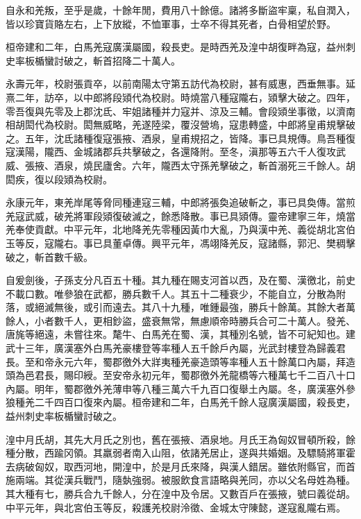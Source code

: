 \begin{pinyinscope}
自永和羌叛，至乎是歲，十餘年閒，費用八十餘億。諸將多斷盜牢稟，私自潤入，皆以珍寶貨賂左右，上下放縱，不恤軍事，士卒不得其死者，白骨相望於野。

桓帝建和二年，白馬羌寇廣漢屬國，殺長吏。是時西羌及湟中胡復畔為寇，益州刺史率板楯蠻討破之，斬首招降二十萬人。

永壽元年，校尉張貢卒，以前南陽太守第五訪代為校尉，甚有威惠，西垂無事。延熹二年，訪卒，以中郎將段熲代為校尉。時燒當八種寇隴右，熲擊大破之。四年，零吾復與先零及上郡沈氐、牢姐諸種并力寇并、涼及三輔。會段熲坐事徵，以濟南相胡閎代為校尉。閎無威略，羌遂陸梁，覆沒營塢，寇患轉盛，中郎將皇甫規擊破之。五年，沈氐諸種復寇張掖、酒泉，皇甫規招之，皆降。事已具規傳。鳥吾種復寇漢陽，隴西、金城諸郡兵共擊破之，各還降附。至冬，滇那等五六千人復攻武威、張掖、酒泉，燒民廬舍。六年，隴西太守孫羌擊破之，斬首溺死三千餘人。胡閎疾，復以段熲為校尉。

永康元年，東羌岸尾等脅同種連寇三輔，中郎將張奐追破斬之，事已具奐傳。當煎羌寇武威，破羌將軍段熲復破滅之，餘悉降散。事已具熲傳。靈帝建寧三年，燒當羌奉使貢獻。中平元年，北地降羌先零種因黃巾大亂，乃與漢中羌、義從胡北宮伯玉等反，寇隴右。事已具董卓傳。興平元年，馮翊降羌反，寇諸縣，郭汜、樊稠擊破之，斬首數千級。

自爰劍後，子孫支分凡百五十種。其九種在賜支河首以西，及在蜀、漢徼北，前史不載口數。唯參狼在武都，勝兵數千人。其五十二種衰少，不能自立，分散為附落，或絕滅無後，或引而遠去。其八十九種，唯鍾最強，勝兵十餘萬。其餘大者萬餘人，小者數千人，更相鈔盜，盛衰無常，無慮順帝時勝兵合可二十萬人。發羌、唐旄等絕遠，未嘗往來。氂牛、白馬羌在蜀、漢，其種別名號，皆不可紀知也。建武十三年，廣漢塞外白馬羌豪樓登等率種人五千餘戶內屬，光武封樓登為歸義君長。至和帝永元六年，蜀郡徼外大牂夷種羌豪造頭等率種人五十餘萬口內屬，拜造頭為邑君長，賜印綬。至安帝永初元年，蜀郡徼外羌龍橋等六種萬七千二百八十口內屬。明年，蜀郡徼外羌薄申等八種三萬六千九百口復舉土內屬。冬，廣漢塞外參狼種羌二千四百口復來內屬。桓帝建和二年，白馬羌千餘人寇廣漢屬國，殺長吏，益州刺史率板楯蠻討破之。

湟中月氏胡，其先大月氏之別也，舊在張掖、酒泉地。月氏王為匈奴冒頓所殺，餘種分散，西踰冈領。其羸弱者南入山阻，依諸羌居止，遂與共婚姻。及驃騎將軍霍去病破匈奴，取西河地，開湟中，於是月氏來降，與漢人錯居。雖依附縣官，而首施兩端。其從漢兵戰鬥，隨埶強弱。被服飲食言語略與羌同，亦以父名母姓為種。其大種有七，勝兵合九千餘人，分在湟中及令居。又數百戶在張掖，號曰義從胡。中平元年，與北宮伯玉等反，殺護羌校尉泠徵、金城太守陳懿，遂寇亂隴右焉。


\end{pinyinscope}
